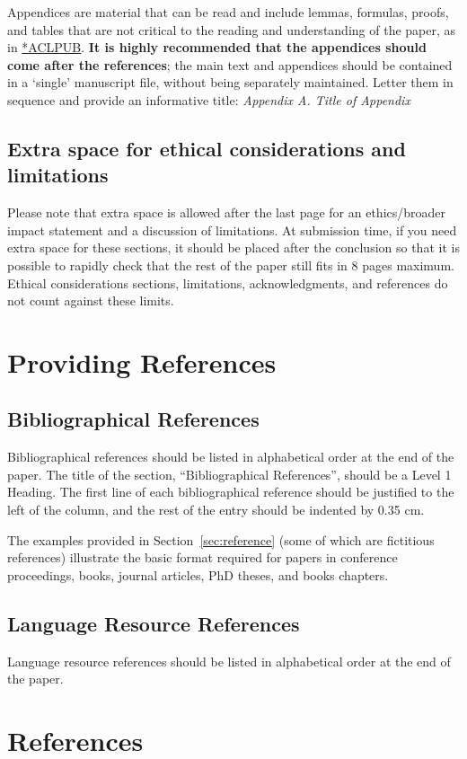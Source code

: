 \documentclass[10pt, a4paper]{article}
\begin{document}
Appendices are material that can be read and include lemmas, formulas, proofs, and tables that are not critical to the reading and understanding of the paper, as in \href{https://acl-org.github.io/ACLPUB/formatting.html#appendices}{*ACLPUB}. \textbf{It is  highly recommended that the appendices should come after the references}; the main text and appendices should be contained in a `single' manuscript file, without being separately maintained. Letter them in sequence and provide an informative title: \textit{Appendix A. Title of Appendix}


\subsection{Extra space for ethical considerations and limitations}

Please note that extra space is allowed after the last page for an ethics/broader impact statement and a discussion of limitations. At submission time, if you need extra space for these sections, it should be placed after the conclusion so that it is possible to rapidly check that the rest of the paper still fits in 8 pages maximum. Ethical considerations sections, limitations, acknowledgments, and references do not count against these limits.

\section{Providing References}

\subsection{Bibliographical References} 

Bibliographical references should be listed in alphabetical order at the end of the paper. The title of the section, ``Bibliographical References'', should be a Level 1 Heading. The first line of each bibliographical reference should be justified to the left of the column, and the rest of the entry should be indented by 0.35 cm.

The examples provided in Section~\ref{sec:reference} (some of which are fictitious references) illustrate the basic format required for papers in conference proceedings, books, journal articles, PhD theses, and books chapters.

\subsection{Language Resource References}

Language resource references should be listed in alphabetical order at the end of the paper.

\nocite{Eco:1990,Martin-90,Chercheur-94,CastorPollux-92,bs-2570-manual,bs-2570-techreport,chomsky-73,hoel-71-portion,hoel-71-whole,singer-whole,Jespersen:1922,Superman-Batman-Catwoman-Spiderman-00}
\section{References}



\end{document}
